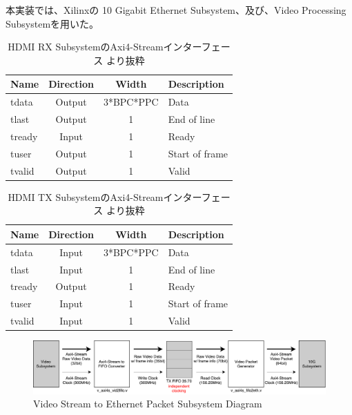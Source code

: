 本実装では、Xilinxの 10 Gigabit Ethernet Subsystem、及び、Video Processing Subsystemを用いた。


\begin{table}[htbp]
  \caption{HDMI RX SubsystemのAxi4-Streamインターフェース \cite{xilinx-pg236}より抜粋}
  \label{tb:pg236-vout-axi4-stream}
  \begin{center}
  \begin{tabular}{l|c|c|l}
    \hline
    Name   & Direction & Width     & Description \\\hline\hline
    tdata  & Output    & 3*BPC*PPC & Data \\\hline
    tlast  & Output    & 1         & End of line \\\hline
    tready & Input     & 1         & Ready \\\hline
    tuser  & Output    & 1         & Start of frame \\\hline
    tvalid & Output    & 1         & Valid \\\hline
  \end{tabular}\end{center}
\end{table}

\begin{table}[htbp]
  \caption{HDMI TX SubsystemのAxi4-Streamインターフェース \cite{xilinx-pg235}より抜粋}
  \label{tb:pg236-vin-axi4-stream}
  \begin{center}
  \begin{tabular}{l|c|c|l}
    \hline
    Name   & Direction & Width     & Description \\\hline\hline
    tdata  & Input     & 3*BPC*PPC & Data \\\hline
    tlast  & Input     & 1         & End of line \\\hline
    tready & Output    & 1         & Ready \\\hline
    tuser  & Input     & 1         & Start of frame \\\hline
    tvalid & Input     & 1         & Valid \\\hline
  \end{tabular}\end{center}
\end{table}

\begin{figure}[htbp]
    \begin{center}
        \includegraphics[bb=0 0 911 166,width=15.5cm]{img/fpga-video-ethernet-diagram.pdf}
    \end{center}
    \caption{Video Stream to Ethernet Packet Subsystem Diagram}
    \label{fig:fpga-video-ethernet-diagram}
\end{figure}

